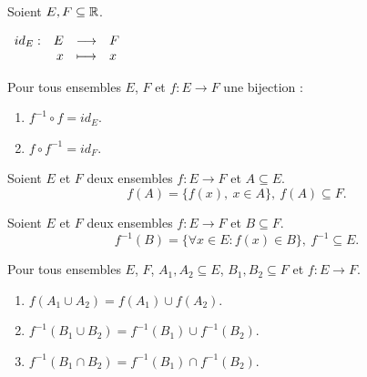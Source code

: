 \begin{definition}
    Soient $E, F \subseteq \mathbb{R}$.
	\begin{center}
		$
		\begin{array}{rrcl} id_E : & E & \longrightarrow & F \\ & x & \longmapsto & x \end{array}
		$
	\end{center}
\end{definition}

\begin{proposition}
	Pour tous ensembles $E$, $F$ et $f : E \to F$ une bijection :
    \begin{multicols}{2}
        \begin{enumerate}
            \item $f^{-1} \circ f = id_E$.
            \item $f \circ f^{-1} = id_F$.
        \end{enumerate}
    \end{multicols}
\end{proposition}

\begin{definition}
    Soient $E$ et $F$ deux ensembles $f : E \to F$ et $A \subseteq E$.
	\[ f(A) = \{ f(x),\ x \in A \},\ f(A) \subseteq F. \]
\end{definition}

\begin{definition}
	Soient $E$ et $F$ deux ensembles $f : E \to F$ et $B \subseteq F$.
	\[ f^{-1}(B) = \{ \forall x \in E : f(x) \in B \},\  f^{-1} \subseteq E. \]
\end{definition}

\begin{proposition}
    Pour tous ensembles $E$, $F$, $A_1, A_2 \subseteq E$, $B_1, B_2 \subseteq F$ et $f : E \to F$.
    \begin{enumerate}
        \item $f(A_1 \cup A_2) = f(A_1) \cup f(A_2)$.
        \item $f^{-1} (B_1 \cup B_2) = f^{-1} (B_1) \cup f^{-1} (B_2)$.
        \item $f^{-1} (B_1 \cap B_2) = f^{-1} (B_1) \cap f^{-1} (B_2)$.
    \end{enumerate}
\end{proposition} 

